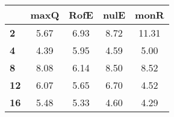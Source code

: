 \begin{tabular}{|l|c|c|c|c|}
\hline
&\textbf{maxQ}&\textbf{RofE}&\textbf{nulE}&\textbf{monR}\\\hline
\textbf{2}&5.67&6.93&8.72&11.31\\\hline
\textbf{4}&4.39&5.95&4.59&5.00\\\hline
\textbf{8}&8.08&6.14&8.50&8.52\\\hline
\textbf{12}&6.07&5.65&6.70&4.52\\\hline
\textbf{16}&5.48&5.33&4.60&4.29\\\hline
\end{tabular}
